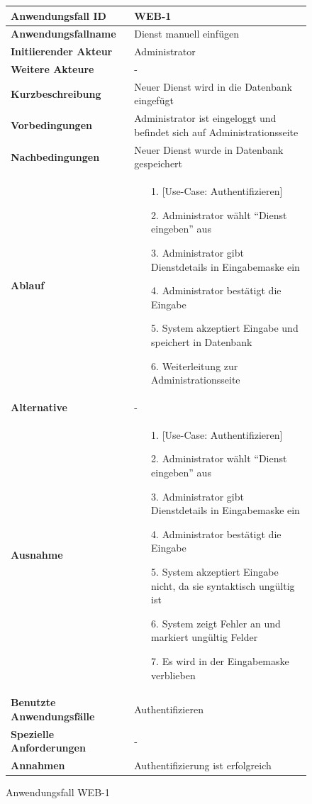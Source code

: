 \begin{figure}[h]
	\centering
	\begin{tabularx}{\textwidth}{ X | X }
		\textbf{Anwendungsfall ID} & WEB-1 \\ \hline
		\textbf{Anwendungsfallname} & Dienst manuell einfügen \\ \hline
		\textbf{Initiierender Akteur} & Administrator \\ \hline
		\textbf{Weitere Akteure} & - \\ \hline
		\textbf{Kurzbeschreibung} & Neuer Dienst wird in die Datenbank eingefügt \\ \hline
		\textbf{Vorbedingungen} & Administrator ist eingeloggt und befindet sich auf Administrationsseite \\ \hline
		\textbf{Nachbedingungen} & Neuer Dienst wurde in Datenbank gespeichert \\ \hline
		\textbf{Ablauf} &
		\begin{enumerate}
			\item [1.] [Use-Case: Authentifizieren]
			\item [2.] Administrator wählt ``Dienst eingeben'' aus
			\item [3.] Administrator gibt Dienstdetails in Eingabemaske ein
			\item [4.] Administrator bestätigt die Eingabe
			\item [5.] System akzeptiert Eingabe und speichert in Datenbank
			\item [6.] Weiterleitung zur Administrationsseite
		\end{enumerate} \\ \hline
		\textbf{Alternative} & - \\ \hline
		\textbf{Ausnahme} &
		\begin{enumerate}
			\item [1.] [Use-Case: Authentifizieren]
			\item [2.] Administrator wählt ``Dienst eingeben'' aus
			\item [3.] Administrator gibt Dienstdetails in Eingabemaske ein
			\item [4.] Administrator bestätigt die Eingabe
			\item [5.] System akzeptiert Eingabe nicht, da sie syntaktisch ungültig ist
			\item [6.] System zeigt Fehler an und markiert ungültig Felder
			\item [7.] Es wird in der Eingabemaske verblieben
		\end{enumerate} \\ \hline
		\textbf{Benutzte Anwendungsfälle} & Authentifizieren \\ \hline
		\textbf{Spezielle Anforderungen} & - \\ \hline
		\textbf{Annahmen} & Authentifizierung ist erfolgreich
	\end{tabularx}
	\caption{Anwendungsfall WEB-1}
	\label{fig:anwendungsfall-server-tabelle-web-1}
\end{figure}

